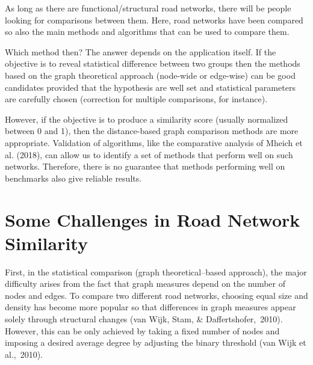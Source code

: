 
As long as there are functional/structural road networks, there will be people looking for comparisons between them. Here, road networks have been compared so also the main methods and algorithms that can be used to compare them.

Which method then? The answer depends on the application itself. If the objective is to reveal statistical difference between two groups then the methods based on the graph theoretical approach (node-wide or edge-wise) can be good candidates provided that the hypothesis are well set and statistical parameters are carefully chosen (correction for multiple comparisons, for instance).

However, if the objective is to produce a similarity score (usually normalized between 0 and 1), then the distance-based graph comparison methods are more appropriate. Validation of algorithms, like the comparative analysis of Mheich et al. (2018), can allow us to identify a set of methods that perform well on such networks.
Therefore, there is no guarantee that methods performing well on benchmarks also give reliable results. \cite{Agryzkov:2012}

\section{Some Challenges in Road Network Similarity}
First, in the statistical comparison (graph theoretical–based approach), the major difficulty arises from the fact that graph measures depend on the number of nodes and edges. To compare two different road networks, choosing equal size and density has become more popular so that differences in graph measures appear solely through structural changes (van Wijk, Stam, & Daffertshofer, 2010). However, this can be only achieved by taking a fixed number of nodes and imposing a desired average degree by adjusting the binary threshold (van Wijk et al., 2010).

